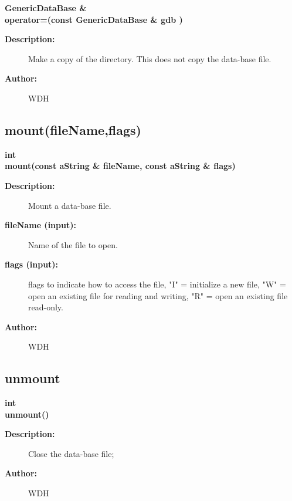 \begin{flushleft} \textbf{%
GenericDataBase \&  \\ 
\settowidth{\GenericDataBaseIncludeArgIndent}{ operator=(}%
operator=(const GenericDataBase \& gdb )
}\end{flushleft}
\begin{description}
\item[{\bf Description:}] 
   Make a copy of the directory. This does not copy the data-base file.
\item[{\bf Author:}]  WDH

\end{description}
\subsection{mount(fileName,flags)}
 
\begin{flushleft} \textbf{%
int  \\ 
\settowidth{\GenericDataBaseIncludeArgIndent}{mount(}%
mount(const aString \& fileName, const aString \& flags)
}\end{flushleft}
\begin{description}
\item[{\bf Description:}] 
   Mount a data-base file.
\item[{\bf fileName (input):}]  Name of the file to open.
\item[{\bf flags (input):}]  flags to indicate how to access the file, "I" = initialize
   a new file, "W" = open an existing file for reading and writing,
   "R" = open an existing file read-only.
\item[{\bf Author:}]  WDH

\end{description}
\subsection{unmount}
 
\begin{flushleft} \textbf{%
int  \\ 
\settowidth{\GenericDataBaseIncludeArgIndent}{unmount(}%
unmount()
}\end{flushleft}
\begin{description}
\item[{\bf Description:}] 
   Close the data-base file;
\item[{\bf Author:}]  WDH

\end{description}

